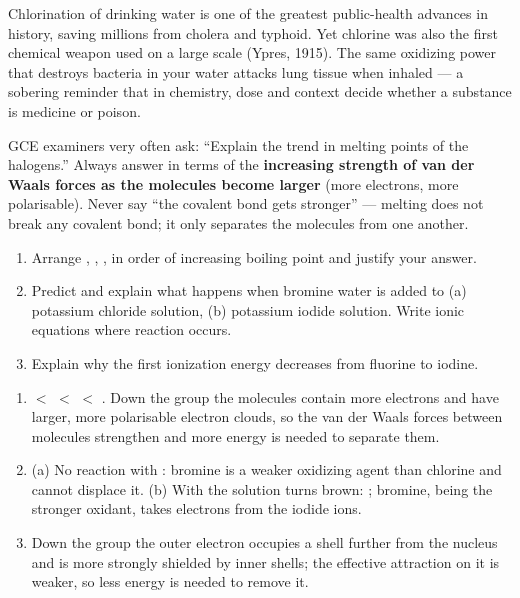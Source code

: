 \documentclass[11pt]{article}
\begin{document}
\begin{savaistu}
Chlorination of drinking water is one of the greatest public-health advances in history, saving millions from cholera and typhoid. Yet chlorine was also the first chemical weapon used on a large scale (Ypres, 1915). The same oxidizing power that destroys bacteria in your water attacks lung tissue when inhaled --- a sobering reminder that in chemistry, dose and context decide whether a substance is medicine or poison.
\end{savaistu}

\begin{attention}
GCE examiners very often ask: ``Explain the trend in melting points of the halogens.'' Always answer in terms of the \textbf{increasing strength of van der Waals forces as the molecules become larger} (more electrons, more polarisable). Never say ``the covalent bond gets stronger'' --- melting  does not break any covalent bond; it only separates the molecules from one another.
\end{attention}

\begin{exercice}
\begin{enumerate}
\item Arrange , , ,  in order of increasing boiling point and justify your answer.
\item Predict and explain what happens when bromine water is added to (a) potassium chloride solution, (b) potassium iodide solution. Write ionic equations where reaction occurs.
\item Explain why the first ionization energy decreases from fluorine to iodine.
\end{enumerate}
\end{exercice}

\begin{corrige}[Exercise 1]
\begin{enumerate}
\item {} $<$  $<$  $<$ . Down the group the  molecules contain more electrons and have larger, more polarisable electron clouds, so the van der Waals forces between molecules strengthen and more energy is needed to separate them.
\item (a) No reaction with : bromine is a weaker oxidizing agent than chlorine and cannot displace it. (b) With  the solution turns brown: ; bromine, being the stronger oxidant, takes electrons from the iodide ions.
\item Down the group the outer electron occupies a shell further from the nucleus and is more strongly shielded by inner shells; the effective attraction on it is weaker, so less energy is needed to remove it.
\end{enumerate}
\end{corrige}
\end{document}
